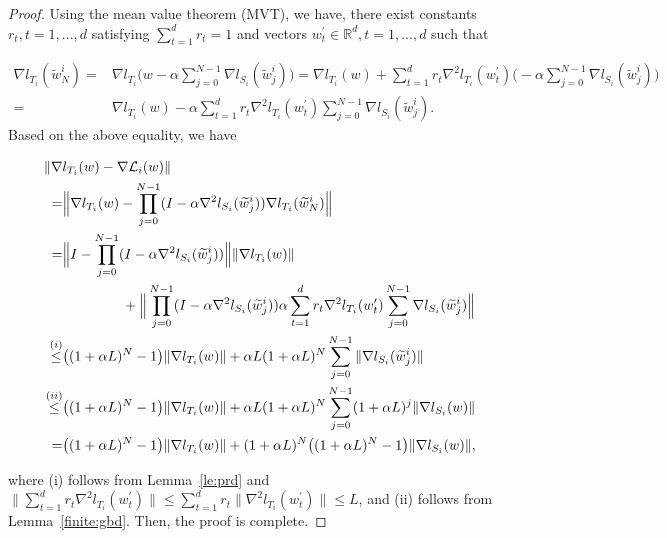 \documentclass{osudissert96}
\begin{document}
\begin{proof}
	Using the mean value theorem (MVT), we have, there exist constants $r_t, t=1,...,d$ satisfying $\sum_{t=1}^d r_t =1$ and vectors $w_t^\prime\in\mathbb{R}^d, t=1,...,d$ such that     

	\begin{align*}
	\nabla l_{T_i}(\widetilde w_N^i) = & \nabla  l_{T_i} \big(w - \alpha \sum_{j=0}^{N-1} \nabla l_{S_i}(\widetilde w_j^i) \big) = \nabla l_{T_i}(w) + \sum_{t=1}^dr_t \nabla^2  l_{T_i} (w_t^\prime)\big(  - \alpha \sum_{j=0}^{N-1} \nabla l_{S_i}(\widetilde w_j^i)      \big) \nonumber
	\\ = &\nabla l_{T_i}(w) - \alpha\sum_{t=1}^dr_t \nabla^2  l_{T_i} (w_t^\prime)\sum_{j=0}^{N-1} \nabla l_{S_i}(\widetilde w_j^i).    
	\end{align*}
	Based on the above equality, we have
	\begin{small}
	\begin{align}
	\|\nabla &l_{T_i}(w) - \nabla \mathcal{L}_i(w)\| \nonumber
	\\=& \Big\|\nabla l_{T_i}(w) - \prod_{j=0}^{N-1}(I - \alpha \nabla^2 l_{S_i}(\widetilde w_{j}^i))\nabla l_{T_i}(\widetilde w_{N}^i)\Big\| \nonumber
	\\ =& \Big\|I - \prod_{j=0}^{N-1}(I - \alpha \nabla^2 l_{S_i}(\widetilde w_{j}^i)) \Big\|\|\nabla l_{T_i}(w)\|\nonumber
	\\&\hspace{1.5cm}+ \Big\| \prod_{j=0}^{N-1}(I - \alpha \nabla^2 l_{S_i}(\widetilde w_{j}^i)) \alpha\sum_{t=1}^dr_t \nabla^2  l_{T_i} (w_t^\prime) \sum_{j=0}^{N-1} \nabla l_{S_i}(\widetilde w_j^i)\Big\| \nonumber 
	\\ \overset{(i)}\leq & \big((1+\alpha L)^N -1\big) \|\nabla l_{T_i}(w)\| + \alpha L(1+\alpha L)^N\sum_{j=0}^{N-1} \|\nabla l_{S_i}(\widetilde w_j^i)\| \nonumber
	\\\overset{(ii)} \leq & \big((1+\alpha L)^N -1\big) \|\nabla l_{T_i}(w)\| + \alpha L(1+\alpha L)^N\sum_{j=0}^{N-1} (1+\alpha L)^j\|\nabla l_{S_i}(w)\| \nonumber
	\\ = & \big((1+\alpha L)^N -1\big) \|\nabla l_{T_i}(w)\| + (1+\alpha L)^N \big((1+\alpha L)^N-1\big)\|\nabla l_{S_i}(w)\|, \nonumber
	\end{align}
	\end{small}
	\hspace{-0.12cm}where (i) follows from Lemma~\ref{le:prd} and $\|\sum_{t=1}^dr_t \nabla^2  l_{T_i} (w_t^\prime)\|\leq \sum_{t=1}^dr_t\| \nabla^2  l_{T_i} (w_t^\prime)\|\leq L$, and (ii) follows from Lemma~\ref{finite:gbd}. Then, the proof is complete. 
\end{proof}	
\end{document}
